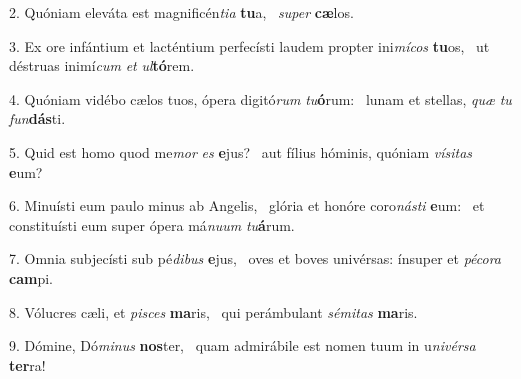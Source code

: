 2. Quóniam eleváta est magnificén\textit{ti}\textit{a} \textbf{tu}a, \ast\  \textit{su}\textit{per} \textbf{cæ}los.\

3. Ex ore infántium et lacténtium perfecísti laudem propter ini\textit{mí}\textit{cos} \textbf{tu}os, \ast\  ut déstruas inimí\textit{cum} \textit{et} \textit{ul}\textbf{tó}rem.\

4. Quóniam vidébo cælos tuos, ópera digitó\textit{rum} \textit{tu}\textbf{ó}rum: \ast\  lunam et stellas, \textit{quæ} \textit{tu} \textit{fun}\textbf{dás}ti.\

5. Quid est homo quod me\textit{mor} \textit{es} \textbf{e}jus? \ast\  aut fílius hóminis, quóniam \textit{ví}\textit{si}\textit{tas} \textbf{e}um?\

6. Minuísti eum paulo minus ab Angelis, \dag\  glória et honóre coro\textit{nás}\textit{ti} \textbf{e}um: \ast\  et constituísti eum super ópera má\textit{nu}\textit{um} \textit{tu}\textbf{á}rum.\

7. Omnia subjecísti sub pé\textit{di}\textit{bus} \textbf{e}jus, \ast\  oves et boves univérsas: ínsuper et \textit{pé}\textit{co}\textit{ra} \textbf{cam}pi.\

8. Vólucres cæli, et \textit{pi}\textit{sces} \textbf{ma}ris, \ast\  qui perámbulant \textit{sé}\textit{mi}\textit{tas} \textbf{ma}ris.\

9. Dómine, Dó\textit{mi}\textit{nus} \textbf{nos}ter, \ast\  quam admirábile est nomen tuum in u\textit{ni}\textit{vér}\textit{sa} \textbf{ter}ra!\


